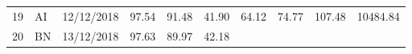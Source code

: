\documentclass[
  11pt,
]{article}
\begin{document}
\begin{longtable}[]{@{}llllllllll@{}}
\begin{minipage}[t]{0.05\columnwidth}\raggedright
19\strut
\end{minipage} & \begin{minipage}[t]{0.07\columnwidth}\raggedright
AI\strut
\end{minipage} & \begin{minipage}[t]{0.11\columnwidth}\raggedright
12/12/2018\strut
\end{minipage} & \begin{minipage}[t]{0.07\columnwidth}\raggedright
97.54\strut
\end{minipage} & \begin{minipage}[t]{0.07\columnwidth}\raggedright
91.48\strut
\end{minipage} & \begin{minipage}[t]{0.07\columnwidth}\raggedright
41.90\strut
\end{minipage} & \begin{minipage}[t]{0.07\columnwidth}\raggedright
64.12\strut
\end{minipage} & \begin{minipage}[t]{0.07\columnwidth}\raggedright
74.77\strut
\end{minipage} & \begin{minipage}[t]{0.08\columnwidth}\raggedright
107.48\strut
\end{minipage} & \begin{minipage}[t]{0.09\columnwidth}\raggedright
10484.84\strut
\end{minipage}\tabularnewline
\begin{minipage}[t]{0.05\columnwidth}\raggedright
20\strut
\end{minipage} & \begin{minipage}[t]{0.07\columnwidth}\raggedright
BN\strut
\end{minipage} & \begin{minipage}[t]{0.11\columnwidth}\raggedright
13/12/2018\strut
\end{minipage} & \begin{minipage}[t]{0.07\columnwidth}\raggedright
97.63\strut
\end{minipage} & \begin{minipage}[t]{0.07\columnwidth}\raggedright
89.97\strut
\end{minipage} & \begin{minipage}[t]{0.07\columnwidth}\raggedright
42.18\strut
\end{minipage} & \begin{minipage}[t]{0.07\columnwidth}\raggedright

\end{minipage}
\end{longtable}
\end{document}
